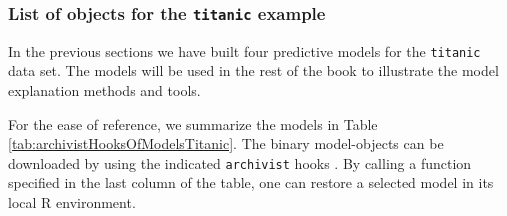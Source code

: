 \documentclass[12pt,]{krantz}
\begin{document}
\hypertarget{ListOfModelsTitanic}{%
\subsubsection{\texorpdfstring{List of objects for the \texttt{titanic} example}{List of objects for the titanic example}}\label{ListOfModelsTitanic}}

In the previous sections we have built four predictive models for the \texttt{titanic} data set. The models will be used in the rest of the book to illustrate the model explanation methods and tools.

For the ease of reference, we summarize the models in Table \ref{tab:archivistHooksOfModelsTitanic}. The binary model-objects can be downloaded by using the indicated \texttt{archivist} hooks \citep{archivist}. By calling a function specified in the last column of the table, one can restore a selected model in its local R environment.
\end{document}
